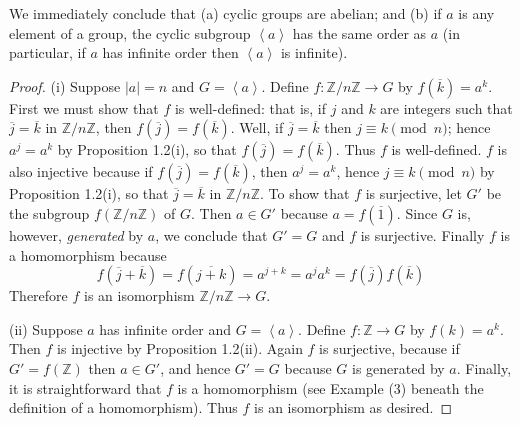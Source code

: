 \documentclass[leqno]{book}
\begin{document}
\noindent We immediately conclude that (a) cyclic groups are abelian; and (b) if $a$ is any element of a group, the cyclic subgroup $\left<a\right>$ has the same order as $a$ (in particular, if $a$ has infinite order then $\left<a\right>$ is infinite). %
\begin{proof}
(i) Suppose $|a|=n$ and $G=\left<a\right>$.  Define $f:\mathbb Z/n\mathbb Z\to G$ by $f(\overline k)=a^k$.  First we must show that $f$ is well-defined: that is, if $j$ and $k$ are integers such that $\overline j=\overline k$ in $\mathbb Z/n\mathbb Z$, then $f(\overline j)=f(\overline k)$.  Well, if $\overline j=\overline k$ then $j\equiv k\pmod n$; hence $a^j=a^k$ by Proposition 1.2(i), so that $f(\overline j)=f(\overline k)$.  Thus $f$ is well-defined.  $f$ is also injective because if $f(\overline j)=f(\overline k)$, then $a^j=a^k$, hence $j\equiv k\pmod n$ by Proposition 1.2(i), so that $\overline j=\overline k$ in $\mathbb Z/n\mathbb Z$.  To show that $f$ is surjective, let $G'$ be the subgroup $f(\mathbb Z/n\mathbb Z)$ of $G$.  Then $a\in G'$ because $a=f(\overline 1)$.  Since $G$ is, however, \emph{generated} by $a$, we conclude that $G'=G$ and $f$ is surjective.  Finally $f$ is a homomorphism because
$$f(\overline j+\overline k)=f(\overline{j+k})=a^{j+k}=a^ja^k=f(\overline j)f(\overline k)$$
Therefore $f$ is an isomorphism $\mathbb Z/n\mathbb Z\to G$.

(ii) Suppose $a$ has infinite order and $G=\left<a\right>$.  Define $f:\mathbb Z\to G$ by $f(k)=a^k$.  Then $f$ is injective by Proposition 1.2(ii).  Again $f$ is surjective, because if $G'=f(\mathbb Z)$ then $a\in G'$, and hence $G'=G$ because $G$ is generated by $a$.  Finally, it is straightforward that $f$ is a homomorphism (see Example (3) beneath the definition of a homomorphism).  Thus $f$ is an isomorphism as desired.
\end{proof}
\end{document}
